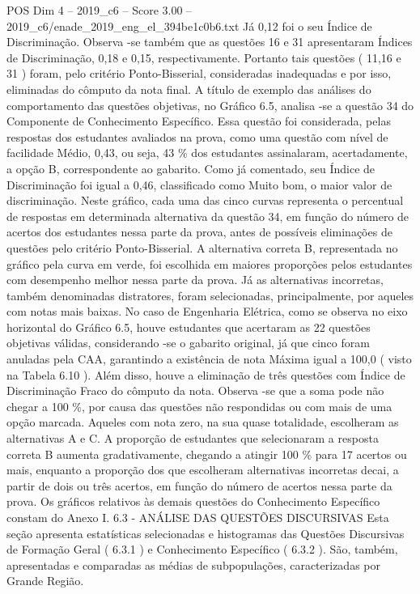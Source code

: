 \begin{textsample}{POS Dim 4 – 2019\_c6 – Score 3.00 – 2019\_c6/enade\_2019\_eng\_el\_394be1c0b6.txt}
Já 0,12 foi o seu Índice de Discriminação.
Observa -se também que as questões 16 e 31 apresentaram Índices de Discriminação, 0,18 e 0,15, respectivamente.
Portanto tais questões ( 11,16 e 31 ) foram, pelo critério Ponto-Bisserial, consideradas inadequadas e por isso, eliminadas do cômputo da nota final.
A título de exemplo das análises do comportamento das questões objetivas, no Gráfico 6.5, analisa -se a questão 34 do Componente de Conhecimento Específico.
Essa questão foi considerada, pelas respostas dos estudantes avaliados na prova, como uma questão com nível de facilidade Médio, 0,43, ou seja, 43 \% dos estudantes assinalaram, acertadamente, a opção B, correspondente ao gabarito.
Como já comentado, seu Índice de Discriminação foi igual a 0,46, classificado como Muito bom, o maior valor de discriminação.
Neste gráfico, cada uma das cinco curvas representa o percentual de respostas em determinada alternativa da questão 34, em função do número de acertos dos estudantes nessa parte da prova, antes de possíveis eliminações de questões pelo critério Ponto-Bisserial.
A alternativa correta B, representada no gráfico pela curva em verde, foi escolhida em maiores proporções pelos estudantes com desempenho melhor nessa parte da prova.
Já as alternativas incorretas, também denominadas distratores, foram selecionadas, principalmente, por aqueles com notas mais baixas.
No caso de Engenharia Elétrica, como se observa no eixo horizontal do Gráfico 6.5, houve estudantes que acertaram as 22 questões objetivas válidas, considerando -se o gabarito original, já que cinco foram anuladas pela CAA, garantindo a existência de nota Máxima igual a 100,0 ( visto na Tabela 6.10 ).
Além disso, houve a eliminação de três questões com Índice de Discriminação Fraco do cômputo da nota.
Observa -se que a soma pode não chegar a 100 \%, por causa das questões não respondidas ou com mais de uma opção marcada.
Aqueles com nota zero, na sua quase totalidade, escolheram as alternativas A e C.
A proporção de estudantes que selecionaram a resposta correta B aumenta gradativamente, chegando a atingir 100 \% para 17 acertos ou mais, enquanto a proporção dos que escolheram alternativas incorretas decai, a partir de dois ou três acertos, em função do número de acertos nessa parte da prova.
Os gráficos relativos às demais questões do Conhecimento Específico constam do Anexo I. 6.3 - ANÁLISE DAS QUESTÕES DISCURSIVAS Esta seção apresenta estatísticas selecionadas e histogramas das Questões Discursivas de Formação Geral ( 6.3.1 ) e Conhecimento Específico ( 6.3.2 ).
São, também, apresentadas e comparadas as médias de subpopulações, caracterizadas por Grande Região.

\end{textsample}
